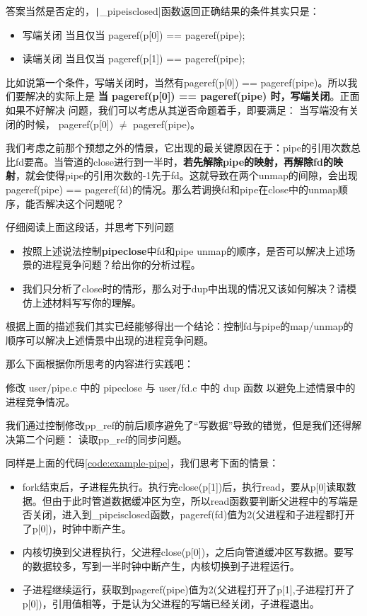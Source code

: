 答案当然是否定的，\texttt|_pipeisclosed|函数返回正确结果的条件其实只是：

\begin{itemize}
	\item 写端关闭 当且仅当 pageref(p[0]) == pageref(pipe);
	\item 读端关闭 当且仅当 pageref(p[1]) == pageref(pipe);
\end{itemize}

比如说第一个条件，写端关闭时，当然有pageref(p[0]) == pageref(pipe)。所以我们要解决的实际上是 \textbf{当 pageref(p[0]) == pageref(pipe) 时，写端关闭}。正面如果不好解决 问题，我们可以考虑从其逆否命题着手，即要满足：{ 当写端没有关闭的时候， pageref(p[0]) $\neq$ pageref(pipe)}。

我们考虑之前那个预想之外的情景，它出现的最关键原因在于：pipe的引用次数总比fd要高。当管道的close进行到一半时，\textbf{若先解除pipe的映射，再解除fd的映射}，就会使得pipe的引用次数的-1先于fd。这就导致在两个unmap的间隙，会出现pageref(pipe) == pageref(fd)的情况。那么若调换fd和pipe在close中的unmap顺序，能否解决这个问题呢？

\begin{thinking}\label{think-race}
	仔细阅读上面这段话，并思考下列问题
	\begin{itemize}
		\item 
		按照上述说法控制\textbf{pipeclose}中fd和pipe unmap的顺序，是否可以解决上述场景的进程竞争问题？给出你的分析过程。
		\item
		我们只分析了close时的情形，那么对于dup中出现的情况又该如何解决？请模仿上述材料写写你的理解。
	\end{itemize}
\end{thinking}

根据上面的描述我们其实已经能够得出一个结论：控制fd与pipe的map/unmap的顺序可以解决上述情景中出现的进程竞争问题。

那么下面根据你所思考的内容进行实践吧：

\begin{exercise}
	修改 user/pipe.c 中的 pipeclose 与 user/fd.c 中的 dup 函数 以避免上述情景中的进程竞争情况。
\end{exercise}

我们通过控制修改pp\_ref的前后顺序避免了“写数据”导致的错觉，但是我们还得解决第二个问题：
读取pp\_ref的同步问题。

同样是上面的代码\ref{code:example-pipe}，我们思考下面的情景：

\begin{itemize}
	\item fork结束后，子进程先执行。执行完close(p[1])后，执行read，要从p[0]读取数据。但由于此时管道数据缓冲区为空，所以read函数要判断父进程中的写端是否关闭，进入到\_pipeisclosed函数，pageref(fd)值为2(父进程和子进程都打开了p[0])，时钟中断产生。
	\item 内核切换到父进程执行，父进程close(p[0])，之后向管道缓冲区写数据。要写的数据较多，写到一半时钟中断产生，内核切换到子进程运行。
	\item 子进程继续运行，获取到pageref(pipe)值为2(父进程打开了p[1],子进程打开了p[0])，引用值相等，于是认为父进程的写端已经关闭，子进程退出。
\end{itemize}

